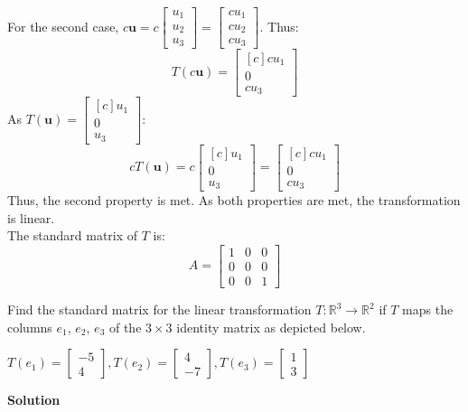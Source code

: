 \documentclass[11pt]{scrartcl}
\theoremstyle{dotlessP}
\theoremstyle{dotlessN}
\begin{document}
For the second case, $c\bm{u} = c 
\begin{bmatrix}
	u_1 \\
	u_2 \\
	u_3
\end{bmatrix} = 
\begin{bmatrix}
	c u_1 \\
	c u_2 \\
	c u_3
\end{bmatrix}
$. Thus:
\[
	T(c\bm{u}) = 
	\begin{bmatrix}[c]
		cu_1 \\
		0 \\
		cu_3
	\end{bmatrix}
\] 
As $T(\bm{u}) = 
\begin{bmatrix}[c]
	u_1 \\
	0 \\
	u_3
\end{bmatrix}
$:
\[
	cT(\bm{u}) = c\begin{bmatrix}[c]
	u_1 \\
	0 \\
	u_3
\end{bmatrix} = 
\begin{bmatrix}[c]
	cu_1 \\
	0 \\
	cu_3
\end{bmatrix}
\]
Thus, the second property is met. As both properties are met, the transformation is linear.
\\

The standard matrix of $T$ is:
\[
A = \begin{bmatrix}
	1 & 0 & 0 \\
	0 & 0 & 0 \\
	0 & 0 & 1
\end{bmatrix}
\] 
\begin{ques}
Find the standard matrix for the linear transformation $T: \mathbb{R}^3 \to \mathbb{R}^2$ if $T$ maps the columns $e_1$, $e_2$, $e_3$ of the $3 \times 3$ identity matrix as depicted below.
\begin{center}
    $T(e_1) = \begin{bmatrix}
        -5 \\ 4
    \end{bmatrix}, T(e_2) = \begin{bmatrix}
        4 \\ -7
    \end{bmatrix}, T(e_3) = \begin{bmatrix}
        1 \\ 3
    \end{bmatrix}$
\end{center}
\end{ques}
\textbf{Solution}
\end{document}

